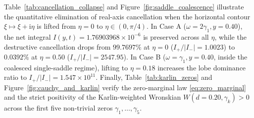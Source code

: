 \documentclass[11pt,a4paper,reqno]{amsart}
\theoremstyle{definition}
\theoremstyle{remark}
\numberwithin{equation}{section}
\newcommand{\ii}{\mathrm{i}}
\begin{document}
Table~\ref{tab:cancellation_collapse} and Figure~\ref{fig:saddle_coalescence} illustrate the quantitative elimination of real-axis cancellation when the horizontal contour $\xi \mapsto \xi + \ii\eta$ is lifted from $\eta = 0$ to $\eta \in (0,\pi/4)$. In Case A ($\omega = 2\gamma_1, y = 0.40$), the net integral $I(y,t) = 1.76903968 \times 10^{-6}$ is preserved across all $\eta$, while the destructive cancellation drops from $99.7697\%$ at $\eta = 0$ ($I_+ / |I_-| = 1.0023$) to $0.0392\%$ at $\eta = 0.50$ ($I_+ / |I_-| = 2547.95$). In Case B ($\omega = \gamma_1, y = 0.40$, inside the coalesced single-saddle regime), lifting to $\eta = 0.18$ increases the lobe dominance ratio to $I_+ / |I_-| = 1.547 \times 10^{11}$. Finally, Table~\ref{tab:karlin_zeros} and Figure~\ref{fig:cauchy_and_karlin} verify the zero-marginal law \eqref{eq:zero_marginal} and the strict positivity of the Karlin-weighted Wronskian $W(d=0.20, \gamma_k) > 0$ across the first five non-trivial zeros $\gamma_1, \dots, \gamma_5$.
\end{document}
